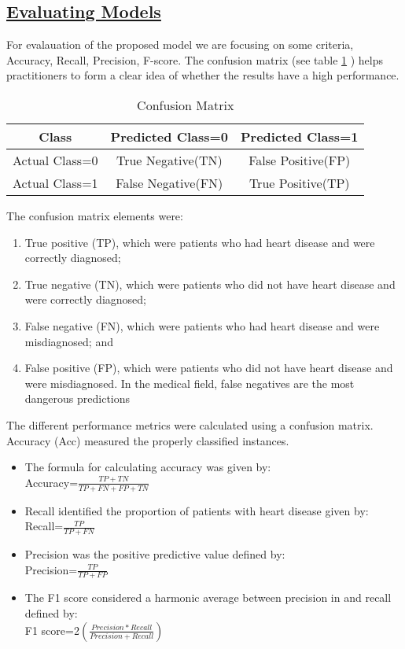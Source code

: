 \documentclass[11pt]{article}
\begin{document}
\subsection{\underline{Evaluating Models}}
For evalauation of the proposed model we are focusing on some criteria, Accuracy, Recall, Precision, F-score.
The confusion matrix (see table \ref{tab:data3} ) helps practitioners to form a clear idea of 
whether the results have a high performance.
\begin{table}[H]
\caption{Confusion Matrix}

\centering

    \begin{tabular}{|c|c|c|}
    \hline
        Class & Predicted Class=0 & Predicted Class=1  \\ \hline
        Actual Class=0 & True Negative(TN) & False Positive(FP) \\ \hline
        Actual Class=1 & False Negative(FN) & True Positive(TP)  \\ \hline
      
    \end{tabular}
\label{tab:data3}
\end{table}
The confusion matrix elements were:
\begin{enumerate}
\vspace{-0.3cm}
\item True positive (TP), which were patients who had heart disease and were correctly diagnosed; 
\vspace{-1cm}
\item True negative (TN), which 
were patients who did not have heart disease and were correctly diagnosed; 
\vspace{-0.3cm}
\item False negative (FN), which were patients who had heart disease and were misdiagnosed; and 
\vspace{-0.3cm}
\item False positive (FP), which were 
patients who did not have heart disease and were misdiagnosed. In the 
medical field, false negatives are the most dangerous predictions

\end{enumerate}  
The different performance metrics were calculated using a confusion 
matrix. Accuracy (Acc) measured the properly classified instances. 

\begin{itemize}
\item The formula for calculating accuracy was given by:\\
Accuracy=$\displaystyle\frac{TP+TN}{TP+FN+FP+TN}$
\item Recall identified the proportion of patients with heart disease given 
by:\\
Recall=$\displaystyle\frac{TP}{TP+FN}$
\item Precision was the positive predictive value defined by:\\
Precision=$\displaystyle\frac{TP}{TP+FP}$
\item The F1 score considered a harmonic average between precision in 
and recall defined by:\\
F1 score=2$\left(\displaystyle\frac{Precision* Recall}{Precision + Recall}\right)$ 
\end{itemize}
\end{document}
